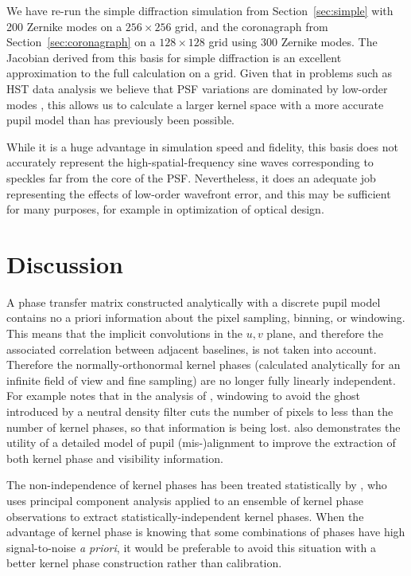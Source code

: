 \documentclass[modern]{aastex63}
\begin{document}
We have re-run the simple diffraction simulation from Section~\ref{sec:simple} with 200 Zernike modes on a $256\times256$ grid, and the coronagraph from Section~\ref{sec:coronagraph} on a $128\times128$ grid using 300 Zernike modes. 
The Jacobian derived from this basis for simple diffraction is an excellent approximation to the full calculation on a grid. Given that in problems such as HST data analysis we believe that PSF variations are dominated by low-order modes \citep{lallo06}, this allows us to calculate a larger kernel space with a more accurate pupil model than has previously been possible. 

While it is a huge advantage in simulation speed and fidelity, this basis does not accurately represent the high-spatial-frequency sine waves corresponding to speckles far from the core of the PSF. Nevertheless, it does an adequate job representing the effects of low-order wavefront error, and this may be sufficient for many purposes, for example in optimization of optical design.

\section{Discussion}
\label{sec:discussion}

A phase transfer matrix constructed analytically with a discrete pupil model contains no a priori information about the pixel sampling, binning, or windowing. This means that the implicit convolutions in the $u,v$ plane, and therefore the associated correlation between adjacent baselines, is not taken into account.  Therefore the normally-orthonormal kernel phases (calculated analytically for an infinite field of view and fine sampling) are no longer fully linearly independent. For example \citet{martinache20} notes that in the analysis of \citet{palomar}, windowing to avoid the ghost introduced by a neutral density filter cuts the number of pixels to less than the number of kernel phases, so that information is being lost. \citet{martinache20} also demonstrates the utility of a detailed model of pupil (mis-)alignment to improve the extraction of both kernel phase and visibility information.

The non-independence of kernel phases has been treated statistically by \citet{ireland13}, who uses principal component analysis applied to an ensemble of kernel phase observations to extract statistically-independent kernel phases. When the advantage of kernel phase is knowing that some combinations of phases have high signal-to-noise \textit{a priori}, it would be preferable to avoid this situation with a better kernel phase construction rather than calibration.
\end{document}
